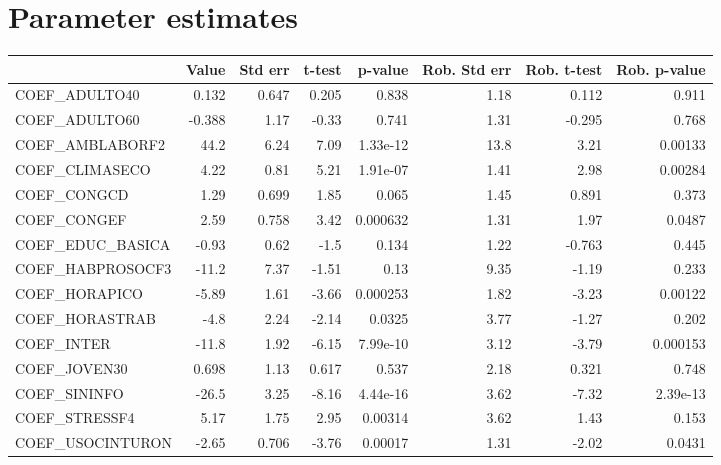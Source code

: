 \section{Parameter estimates}
\begin{tabular}{lrrrrrrr}
\toprule
{} &  Value &  Std err &  t-test &  p-value &  Rob. Std err &  Rob. t-test &  Rob. p-value \\
\midrule
COEF\_ADULTO40       &  0.132 &    0.647 &   0.205 &    0.838 &          1.18 &        0.112 &         0.911 \\
COEF\_ADULTO60       & -0.388 &     1.17 &   -0.33 &    0.741 &          1.31 &       -0.295 &         0.768 \\
COEF\_AMBLABORF2     &   44.2 &     6.24 &    7.09 & 1.33e-12 &          13.8 &         3.21 &       0.00133 \\
COEF\_CLIMASECO      &   4.22 &     0.81 &    5.21 & 1.91e-07 &          1.41 &         2.98 &       0.00284 \\
COEF\_CONGCD         &   1.29 &    0.699 &    1.85 &    0.065 &          1.45 &        0.891 &         0.373 \\
COEF\_CONGEF         &   2.59 &    0.758 &    3.42 & 0.000632 &          1.31 &         1.97 &        0.0487 \\
COEF\_EDUC\_BASICA    &  -0.93 &     0.62 &    -1.5 &    0.134 &          1.22 &       -0.763 &         0.445 \\
COEF\_HABPROSOCF3    &  -11.2 &     7.37 &   -1.51 &     0.13 &          9.35 &        -1.19 &         0.233 \\
COEF\_HORAPICO       &  -5.89 &     1.61 &   -3.66 & 0.000253 &          1.82 &        -3.23 &       0.00122 \\
COEF\_HORASTRAB      &   -4.8 &     2.24 &   -2.14 &   0.0325 &          3.77 &        -1.27 &         0.202 \\
COEF\_INTER          &  -11.8 &     1.92 &   -6.15 & 7.99e-10 &          3.12 &        -3.79 &      0.000153 \\
COEF\_JOVEN30        &  0.698 &     1.13 &   0.617 &    0.537 &          2.18 &        0.321 &         0.748 \\
COEF\_SININFO        &  -26.5 &     3.25 &   -8.16 & 4.44e-16 &          3.62 &        -7.32 &      2.39e-13 \\
COEF\_STRESSF4       &   5.17 &     1.75 &    2.95 &  0.00314 &          3.62 &         1.43 &         0.153 \\
COEF\_USOCINTURON    &  -2.65 &    0.706 &   -3.76 &  0.00017 &          1.31 &        -2.02 &        0.0431 \\

\end{tabular}
